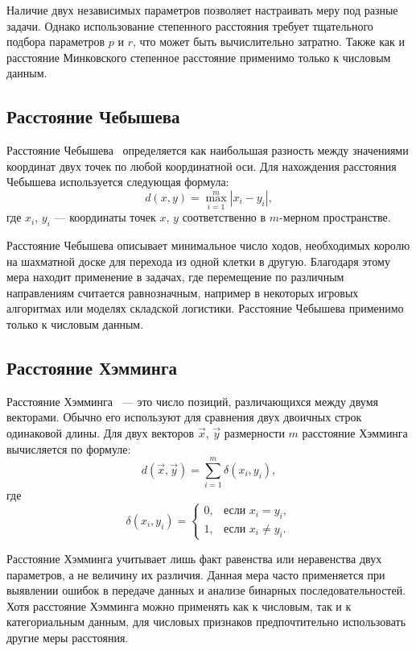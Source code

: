 Наличие двух независимых параметров позволяет настраивать меру под разные задачи. Однако использование степенного расстояния требует тщательного подбора параметров $p$ и $r$, что может быть вычислительно затратно. Также как и расстояние Минковского степенное расстояние применимо только к числовым данным.

\subsection{Расстояние Чебышева}
Расстояние Чебышева~\cite{Clast} определяется как наибольшая разность между значениями координат двух точек по любой координатной оси. Для нахождения расстояния Чебышева используется следующая формула:
\begin{equation}
	d(x, y) = \max_{i=1}^m{|x_i - y_i|},
\end{equation}
где $x_i$, $y_i$ --- координаты точек $x$, $y$ соответственно в $m$-мерном пространстве.

Расстояние Чебышева описывает минимальное число ходов, необходимых королю на шахматной доске для перехода из одной клетки в другую. Благодаря этому мера находит применение в задачах, где перемещение по различным направлениям считается равнозначным, например в некоторых игровых алгоритмах или моделях складской логистики. Расстояние Чебышева применимо только к числовым данным.

\subsection{Расстояние Хэмминга}
Расстояние Хэмминга~\cite{Hamming} --- это число позиций, различающихся между двумя векторами. Обычно его используют для сравнения двух двоичных строк одинаковой длины. Для двух векторов $\vec{x}$, $\vec{y}$ размерности $m$ расстояние Хэмминга вычисляется по формуле:
\begin{equation}
	d(\vec{x}, \vec{y}) = \sum_{i=1}^m{\delta(x_i, y_i)},
\end{equation}
где 
\begin{equation}
\delta(x_i, y_i) =
\begin{cases}
	0, & \text{если } x_i = y_i, \\
	1, & \text{если } x_i \neq y_i.
\end{cases}
\end{equation}

Расстояние Хэмминга учитывает лишь факт равенства или неравенства двух параметров, а не величину их различия. Данная мера часто применяется при выявлении ошибок в передаче данных и анализе бинарных последовательностей. Хотя расстояние Хэмминга можно применять как к числовым, так и к категориальным данным, для числовых признаков предпочтительно использовать другие меры расстояния.

